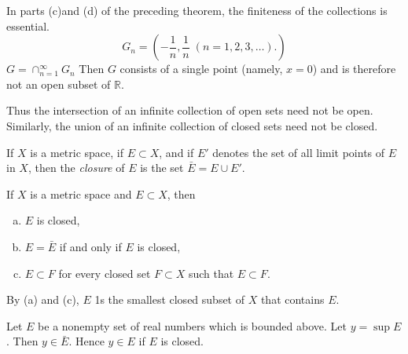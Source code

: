 
\begin{myExample}
    In parts (c)and (d) of the preceding theorem, the finiteness of the collections is essential.
    \begin{equation*}
        G_n = \left(-\frac{1}{n}, \frac{1}{n} \; (n=1,2,3,\dots). \right)
    \end{equation*}
    $G = \cap_{n=1}^\infty G_n$
    Then $G$ consists of a single point (namely, $x = 0$) and is therefore not an open subset of $\mathbb{R}$.
    
    Thus the intersection of an infinite collection of open sets need not be open. Similarly, the union of an infinite collection of closed sets need not be closed.
\end{myExample}

\begin{myDef}
    \label{myDef:2.26 closure}
    If $X$ is a metric space, if $E \subset X$, and if $E'$ denotes the set of all limit points of $E$ in $X$, then the \emph{closure} of $E$ is the set $\bar{E}=E \cup E'$.
\end{myDef}

\begin{thm}
    \label{thm:2.27}
    If $X$ is a metric space and $E \subset X$, then
    \begin{enumerate}[(a)]
        \item $E$ is closed,
        \item $E = \bar{E}$ if and only if $E$ is closed,
        \item $E \subset F$ for every closed set $F \subset X$ such that $E \subset F$.
    \end{enumerate}
\end{thm}
By (a) and (c), $E$ 1s the smallest closed subset of $X$ that contains $E$.

\begin{thm}
    \label{thm:2.28}
    Let $E$ be a nonempty set of real numbers which is bounded above.     Let $y = \sup E$. Then $y \in \bar{E}$. Hence $y \in E$ if $E$ is closed.
\end{thm}

